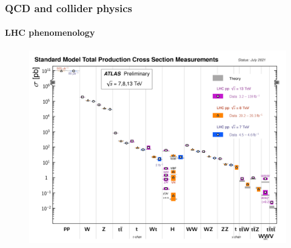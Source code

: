 \documentclass[aspectratio=43]{beamer}
\begin{document}
\begin{frame}
	
	\frametitle{QCD and collider physics}
	\framesubtitle{LHC phenomenology}
	
	\begin{figure}
		\includegraphics[width = 8.5 cm]{plots/part1/chapter3/lhc_measurements.png}
	\end{figure}
		
\end{frame}

%
%

\begin{frame}


\end{frame}
\end{document}
